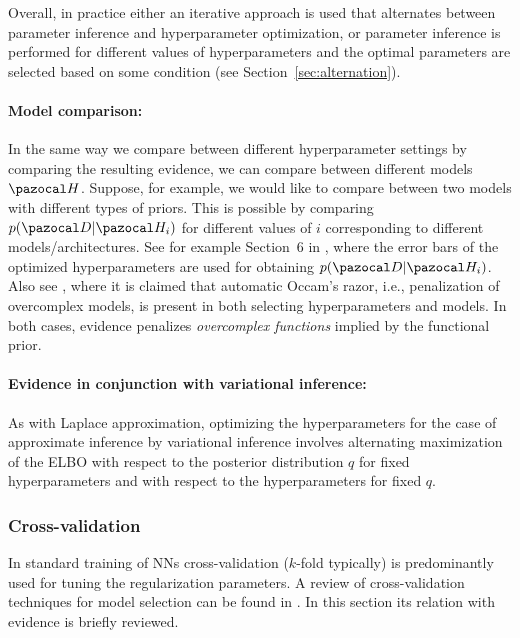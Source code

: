 Overall, in practice either an iterative approach is used that alternates between parameter inference and hyperparameter optimization, or parameter inference is performed for different values of hyperparameters and the optimal parameters are selected based on some condition (see Section~\ref{sec:alternation}). 

\paragraph{Model comparison:}  
In the same way we compare between different hyperparameter settings by comparing the resulting evidence, we can compare between different models $\cH$. 
Suppose, for example, we would like to compare between two models with different types of priors. 
This is possible by comparing $p(\cD|\cH_i)$ for different values of $i$ corresponding to different models/architectures. 
See for example Section~6 in \textcite{mackay1992bayesian}, where the error bars of the optimized hyperparameters are used for obtaining $p(\cD|\cH_i)$. 
Also see \textcite{rasmussen2001occam}, where it is claimed that automatic Occam's razor, i.e., penalization of overcomplex models, is present in both selecting hyperparameters and models. 
In both cases, evidence penalizes \textit{overcomplex functions} implied by the functional prior. 

\paragraph{Evidence in conjunction with variational inference:} 
As with Laplace approximation, optimizing the hyperparameters for the case of approximate inference by variational inference involves alternating maximization of the ELBO with respect to the posterior distribution $q$ for fixed hyperparameters and with respect to the hyperparameters for fixed $q$.

\subsubsection{Cross-validation}

In standard training of NNs cross-validation ($k$-fold typically) is predominantly used for tuning the regularization parameters.
A review of cross-validation techniques for model selection can be found in \textcite{arlot2010survey}. 
In this section its relation with evidence is briefly reviewed. 

